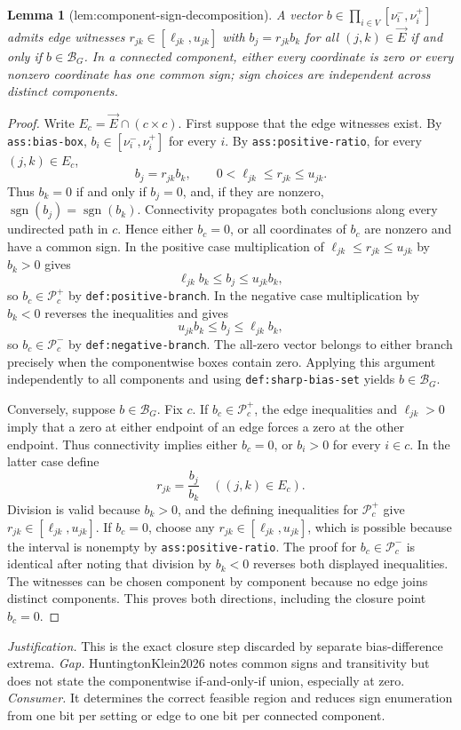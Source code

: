 \documentclass{article}
\newtheorem{lemma}{Lemma}
\begin{document}
\begin{lemma}[lem:component-sign-decomposition]\label{lem:component-sign-decomposition}
A vector \(b\in\prod_{i\in V}[\nu^-_i,\nu^+_i]\) admits edge witnesses \(r_{jk}\in[\ell_{jk},u_{jk}]\) with \(b_j=r_{jk}b_k\) for all \((j,k)\in\vec E\) if and only if \(b\in\mathcal B_G\). In a connected component, either every coordinate is zero or every nonzero coordinate has one common sign; sign choices are independent across distinct components.
\end{lemma}
\begin{proof}
Write \(E_c=\vec E\cap(c\times c)\).  First suppose that the edge witnesses exist.  By \texttt{ass:bias-box}, \(b_i\in[\nu_i^-,\nu_i^+]\) for every \(i\).  By \texttt{ass:positive-ratio}, for every \((j,k)\in E_c\),
\[
 b_j=r_{jk}b_k,\qquad 0<\ell_{jk}\le r_{jk}\le u_{jk}.
\]
Thus \(b_k=0\) if and only if \(b_j=0\), and, if they are nonzero, \(\operatorname{sgn}(b_j)=\operatorname{sgn}(b_k)\).  Connectivity propagates both conclusions along every undirected path in \(c\).  Hence either \(b_c=0\), or all coordinates of \(b_c\) are nonzero and have a common sign.  In the positive case multiplication of \(\ell_{jk}\le r_{jk}\le u_{jk}\) by \(b_k>0\) gives
\[
 \ell_{jk}b_k\le b_j\le u_{jk}b_k,
\]
so \(b_c\in\mathcal P_c^+\) by \texttt{def:positive-branch}.  In the negative case multiplication by \(b_k<0\) reverses the inequalities and gives
\[
 u_{jk}b_k\le b_j\le\ell_{jk}b_k,
\]
so \(b_c\in\mathcal P_c^-\) by \texttt{def:negative-branch}.  The all-zero vector belongs to either branch precisely when the componentwise boxes contain zero.  Applying this argument independently to all components and using \texttt{def:sharp-bias-set} yields \(b\in\mathcal B_G\).

Conversely, suppose \(b\in\mathcal B_G\).  Fix \(c\).  If \(b_c\in\mathcal P_c^+\), the edge inequalities and \(\ell_{jk}>0\) imply that a zero at either endpoint of an edge forces a zero at the other endpoint.  Thus connectivity implies either \(b_c=0\), or \(b_i>0\) for every \(i\in c\).  In the latter case define
\[
 r_{jk}=\frac{b_j}{b_k}\quad((j,k)\in E_c).
\]
Division is valid because \(b_k>0\), and the defining inequalities for \(\mathcal P_c^+\) give \(r_{jk}\in[\ell_{jk},u_{jk}]\).  If \(b_c=0\), choose any \(r_{jk}\in[\ell_{jk},u_{jk}]\), which is possible because the interval is nonempty by \texttt{ass:positive-ratio}.  The proof for \(b_c\in\mathcal P_c^-\) is identical after noting that division by \(b_k<0\) reverses both displayed inequalities.  The witnesses can be chosen component by component because no edge joins distinct components.  This proves both directions, including the closure point \(b_c=0\).
\end{proof}
\par\smallskip\noindent \textit{Justification.} This is the exact closure step discarded by separate bias-difference extrema. \textit{Gap.} HuntingtonKlein2026 notes common signs and transitivity but does not state the componentwise if-and-only-if union, especially at zero. \textit{Consumer.} It determines the correct feasible region and reduces sign enumeration from one bit per setting or edge to one bit per connected component.
\end{document}

